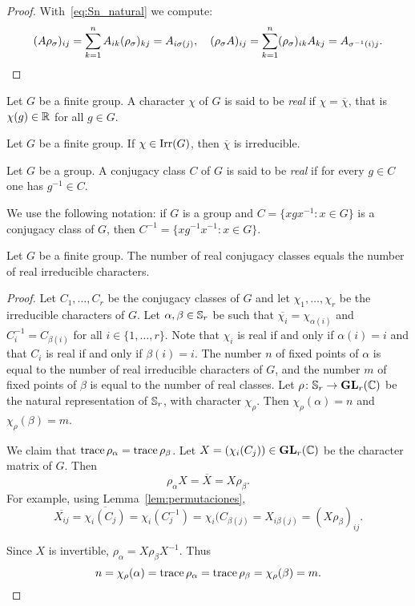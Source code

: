 \begin{proof}
	With~\eqref{eq:Sn_natural} we compute:
	\[
		(A\rho_{\sigma})_{ij}=\sum_{k=1}^n A_{ik}(\rho_{\sigma})_{kj}=A_{i\sigma(j)},
		\quad
		(\rho_\sigma A)_{ij}=\sum_{k=1}^n (\rho_\sigma)_{ik}A_{kj}=A_{\sigma^{-1}(i)j}.\qedhere
	\]
\end{proof}

\begin{definition}
  Let $G$ be a finite group. A character $\chi$ of $G$ is said to be
  \emph{real} if
  $\chi=\overline{\chi}$, that is $\chi(g)\in\mathbb{R}$ for all $g\in G$. 
\end{definition}

\begin{exercise}
	\label{xca:chi_irreducible}
	Let $G$ be a finite group. If $\chi\in\operatorname{Irr}(G)$, then 
	$\overline{\chi}$ is irreducible.
\end{exercise}

\begin{definition}
  Let $G$ be a group. A conjugacy class $C$ of $G$ is said to be
  \emph{real} if for every $g\in C$ one has $g^{-1}\in C$. 
\end{definition}

We use the following notation: if $G$ is a group and $C=\{xgx^{-1}:x\in G\}$ is a conjugacy class of  
$G$, then $C^{-1}=\{xg^{-1}x^{-1}:x\in G\}$.  

\begin{theorem}[Burnside]
    Let $G$ be a finite group. The number of real conjugacy classes 
    equals the number of real irreducible characters. 
\end{theorem}

\begin{proof}
  Let $C_1,\dots,C_r$ be the conjugacy classes of $G$ and  
  let $\chi_1,\dots,\chi_r$ be the irreducible characters of $G$. 
  Let $\alpha,\beta\in\mathbb{S}_r$ be such that $\overline{\chi_i}=\chi_{\alpha(i)}$ and 
  $C_i^{-1}=C_{\beta(i)}$ for all $i\in\{1,\dots,r\}$. Note that $\chi_i$
  is real if and only if $\alpha(i)=i$ and that $C_i$ is real if and only if 
  $\beta(i)=i$. The number $n$ of fixed points of $\alpha$ is equal to the number
  of real irreducible characters of $G$, and the number $m$ of fixed points of $\beta$ is equal
  to the number of real classes. 
  Let $\rho\colon\mathbb{S}_r\to\mathbf{GL}_r(\mathbb{C})$ be the natural representation of $\mathbb{S}_r$, with character $\chi_\rho$.
  Then $\chi_\rho(\alpha)=n$ and $\chi_\rho(\beta)=m$. 
  
  We claim that 
  $\operatorname{trace}\rho_\alpha=\operatorname{trace}\rho_\beta$. Let $X=(\chi_i(C_j))\in\mathbf{GL}_r(\mathbb{C})$ be the character matrix of $G$. 
  Then 
  \[
	\rho_\alpha X=\overline{X}=X\rho_\beta.
  \]
  For example, using Lemma~\ref{lem:permutaciones}, 
  \[
  \overline{X_{ij}}=\overline{\chi_i(C_j)}
  =\chi_i(C_j^{-1})=\chi_i(C_{\beta(j)}=X_{i\beta(j)}=(X\rho_\beta)_{ij}.
  \]
  
  Since $X$ is invertible, $\rho_{\alpha}=X\rho_{\beta}X^{-1}$. Thus 
  \[
    n=\chi_{\rho}(\alpha)=\operatorname{trace}\rho_{\alpha}=\operatorname{trace}\rho_{\beta}=\chi_{\rho}(\beta)=m.\qedhere
  \]
\end{proof}

